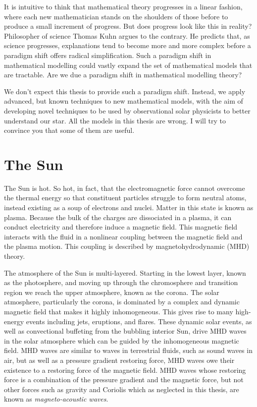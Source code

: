 It is intuitive to think that mathematical theory progresses in a linear fashion, where each new mathematician stands on the shoulders of those before to produce a small increment of progress. But does progress look like this in reality? Philosopher of science Thomas Kuhn argues to the contrary. He predicts that, as science progresses, explanations tend to become more and more complex before a paradigm shift offers radical simplification. Such a paradigm shift in mathematical modelling could vastly expand the set of mathematical models that are tractable. Are we due a paradigm shift in mathematical modelling theory?

We don't expect this thesis to provide such a paradigm shift. Instead, we apply advanced, but known techniques to new mathematical models, with the aim of developing novel techniques to be used by observational solar physicists to better understand our star. All the models in this thesis are wrong. I will try to convince you that some of them are useful.


\section{The Sun}
\label{sec: sun}

The Sun is hot. So hot, in fact, that the electromagnetic force cannot overcome the thermal energy so that constituent particles struggle to form neutral atoms, instead existing as a soup of electrons and nuclei. Matter in this state is known as plasma. Because the bulk of the charges are dissociated in a plasma, it can conduct electricity and therefore induce a magnetic field. This magnetic field interacts with the fluid in a nonlinear coupling between the magnetic field and the plasma motion. This coupling is described by magnetohydrodynamic (MHD) theory.

The atmosphere of the Sun is multi-layered. Starting in the lowest layer, known as the photosphere, and moving up through the chromosphere and transition region we	reach the upper atmosphere, known as the corona. The solar atmosphere, particularly the corona, is dominated by a complex and dynamic magnetic field that makes it highly inhomogeneous. This gives rise to many high-energy events including jets, eruptions, and flares. These dynamic solar events, as well as convectional buffeting from the bubbling interior Sun, drive MHD waves in the solar atmosphere which can be guided by the inhomogeneous magnetic field. MHD waves are similar to waves in terrestrial fluids, such as sound waves in air, but as well as a pressure gradient restoring force, MHD waves owe their existence to a restoring force of the magnetic field. MHD waves whose restoring force is a combination of the pressure gradient and the magnetic force, but not other forces such as gravity and Coriolis which as neglected in this thesis, are known as \textit{magneto-acoustic waves}.

